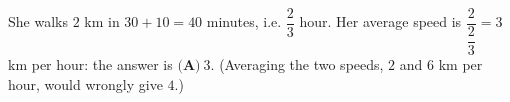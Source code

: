 She walks $2$ km in $30+10=40$ minutes, i.e. $\dfrac23$ hour. Her average speed is $\dfrac{2}{\dfrac23}=3$ km per hour: the answer is $\boxed{\textbf{(A)}\ 3}$. (Averaging the two speeds, $2$ and $6$ km per hour, would wrongly give $4$.)
